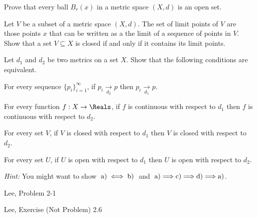 \documentclass[minion]{homework651}
\newcommand\converges[1]{\mathrel{\mathop{\longrightarrow}\limits_{#1}}}
\begin{document}
\begin{problems}
\problem Prove that every ball $B_r(x)$ in a metric space $(X,d)$ is an open set.

\problem Let $V$ be a subset of a metric space $(X,d)$.  The set of limit
points of $V$ are those points $x$ that can be written as a the limit of a 
sequence of points in $V$.  Show that a set $V\subseteq X$ is closed if and only if
it contains its limit points.

\problem Let $d_1$ and $d_2$ be two metrics on a set $X$.  Show that the following
conditions are equivalent.
\begin{subproblems}
\item For every sequence $\{ p_i\}_{i=1}^\infty$, if $p_i\converges{d_2} p$ 
then $p_i\converges{d_1} p$.
\item For every function $f:X\rightarrow \Reals$, if $f$ is continuous with 
respect to $d_1$ then $f$ is continuous with respect to $d_2$.
\item For every set $V$, if $V$ is closed with respect to $d_1$ then
$V$ is closed with respect to $d_2$.
\item For every set $U$, if $U$ is open with respect to $d_1$ then
$U$ is open with respect to $d_2$.
\end{subproblems}

{\it Hint:} You might want to show $\;{\rm a)} \iff {\rm b)}\;$ and $\;{\rm a)} \Longrightarrow {\rm c)} \Longrightarrow {\rm d)} 
\Longrightarrow {\rm a)}$.

\problem Lee, Problem 2-1

\problem Lee, Exercise (Not Problem) 2.6


\end{problems}
\end{document}
